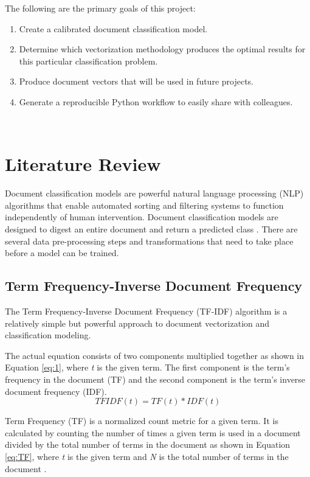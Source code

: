 \documentclass[5p,authoryear]{elsarticle}
\begin{document}
The following are the primary goals of this project:
\begin{enumerate}
 \item Create a calibrated document classification model.
 \item Determine which vectorization methodology produces the optimal results for this particular classification problem.
 \item Produce document vectors that will be used in future projects.
 \item Generate a reproducible Python workflow to easily share with colleagues. 
\end{enumerate} \\


\section{Literature Review}\label{lit_rev}

Document classification models are powerful natural language processing (NLP) algorithms that enable automated sorting and filtering systems to function independently of human intervention. Document classification models are designed to digest an entire document and return a predicted class \citep{chollet}. There are several data pre-processing steps and transformations that need to take place before a model can be trained. 

\subsection{Term Frequency-Inverse Document Frequency}\label{tf}

The Term Frequency-Inverse Document Frequency (TF-IDF) algorithm is a relatively simple but powerful approach to document vectorization and classification modeling. 

The actual equation consists of two components multiplied together as shown in Equation \ref{eq:1}, where \textit{t} is the given term. 
The first component is the term's frequency in the document (TF) and the second component is the term's inverse document frequency (IDF). 
\begin{equation}
    TFIDF(t) = TF(t) * IDF(t)\label{eq:1}
\end{equation}

Term Frequency (TF) is a normalized count metric for a given term. It is calculated by counting the number of times a given term is used in a document divided by the total number of terms in the document as shown in Equation \ref{eq:TF}, where \textit{t} is the given term and \textit{N} is the total number of terms in the document \citep{mining}.
\end{document}
